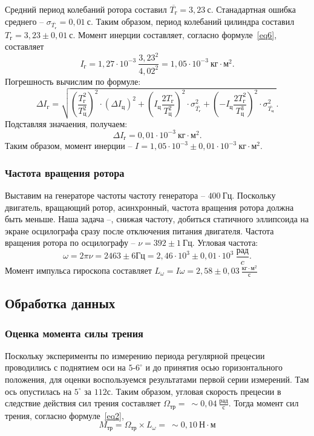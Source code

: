\documentclass[a4paper,11pt]{article}
\begin{document}
Средний период колебаний ротора составил $\overline{T_{г}} = 3,23\ с$.\newline
Станадартная ошибка среднего -- $\sigma_{\overline{T_{г}}}= 0,01\ с$.\newline
Таким образом, период колебаний цилиндра составил $T_{г} = 3,23 \pm 0,01\ с$.\newline
Момент инерции составляет, согласно формуле~\ref{eq6}, составляет
$$I_{г} = 1,27 \cdot 10^{-3}\ \frac{3,23^{2}}{4,02^{2}} = 1,05 \cdot 10^{-3}\ кг \cdot м^{2}.$$
Погрешность вычислим по формуле:
$$\Delta I_{г} = \sqrt{\left(\frac{T_{г}^{2}}{T_{ц}^{2}}\right)^{2} \cdot \left(\Delta I_{ц}\right)^{2} + \left(I_{ц} \frac{2T_{г}}{T_{ц}^{2}}\right)^{2} \cdot \sigma_{\overline{T_{г}}}^{2} + \left(-I_{ц} \frac{2T_{г}^{2}}{T_{ц}^{3}}\right)^{2} \cdot \sigma_{\overline{T_{ц}}}^{2}\ }.$$
Подставляя значаения, получаем:
$$\Delta I_{г} = 0,01 \cdot 10^{-3}\ кг \cdot м^{2}.$$
Таким образом, момент инерции -- $I = 1,05 \cdot 10^{-3} \pm 0,01 \cdot 10^{-3}\ кг \cdot м^{2}.$
\subsubsection{Частота вращения ротора} %
Выставим на генераторе частоты частоту генератора -- $400\ Гц$. Поскольку двигатель, вращающий ротор, асинхронный, частота вращения ротора должна быть меньше. Наша задача --, снижая частоту, добиться статичного эллипсоида на экране осцилографа сразу после отключения питания двигателя.\newline
Частота вращения ротора по осцилографу -- $\nu = 392 \pm 1\ Гц$.\newline
Угловая частота:
$$\omega = 2 \pi \nu = 2463 \pm 6 Гц = 2,46 \cdot 10^{3} \pm 0,01 \cdot 10^{3}\ \frac{рад}{c}.$$
Момент импульса гироскопа составляет $L_{\omega} = I \omega = 2,58 \pm 0,03\ \frac{кг \cdot м^{2}}{с}$
\subsection{Обработка данных}
\subsubsection{Оценка момента силы трения} %
Поскольку эксперименты по измерению периода регулярной прецесии проводились с поднятием оси на $5$-$6^{\circ}$ и до принятия осью горизонтального положения, для оценки воспользуемся результатами первой серии измерений. Там ось опустилась на $5^{\circ}$ за $112 с$. Таким образом, угловая скорость прецесии в следствие действия сил трения составляет $\Omega_{тр} =\ \sim0,04\ \frac{рад}{с}$. Тогда момент сил трения, согласно формуле~\ref{eq2},
$$M_{тр} = \Omega_{тр} \times L_{\omega} =\ \sim0,10\ Н \cdot м$$
\end{document}
